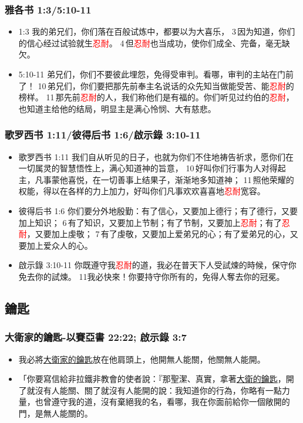 \subsubsection{雅各书 1:3/5:10-11} 
\begin{itemize}[noitemsep]
\item 1:3 我的弟兄们，你们落在百般试炼中，都要以为大喜乐， 3 因为知道，你们的信心经过试验就生\textcolor{red}{忍耐}。 4 但\textcolor{red}{忍耐}也当成功，使你们成全、完备，毫无缺欠。

\item 5:10-11 弟兄们，你们不要彼此埋怨，免得受审判。看哪，审判的主站在门前了！ 10 弟兄们，你们要把那先前奉主名说话的众先知当做能受苦、能\textcolor{red}{忍耐}的榜样。 11 那先前\textcolor{red}{忍耐}的人，我们称他们是有福的。你们听见过约伯的\textcolor{red}{忍耐}，也知道主给他的结局，明显主是满心怜悯、大有慈悲。
\end{itemize}




\subsubsection{歌罗西书 1:11/彼得后书 1:6/啟示錄 3:10-11} 
\begin{itemize}[noitemsep]
\item 歌罗西书 1:11 我们自从听见的日子，也就为你们不住地祷告祈求，愿你们在一切属灵的智慧悟性上，满心知道神的旨意， 10 好叫你们行事为人对得起主，凡事蒙他喜悦，在一切善事上结果子，渐渐地多知道神； 11 照他荣耀的权能，得以在各样的力上加力，好叫你们凡事欢欢喜喜地\textcolor{red}{忍耐}宽容。
 
\item 彼得后书 1:6 你们要分外地殷勤：有了信心，又要加上德行；有了德行，又要加上知识； 6 有了知识，又要加上节制；有了节制，又要加上\textcolor{red}{忍耐}；有了\textcolor{red}{忍耐}，又要加上虔敬； 7 有了虔敬，又要加上爱弟兄的心；有了爱弟兄的心，又要加上爱众人的心。

\item 啟示錄 3:10-11 你既遵守我\textcolor{red}{忍耐}的道，我必在普天下人受試煉的時候，保守你免去你的試煉。 11我必快來！你要持守你所有的，免得人奪去你的冠冕。
\end{itemize}




\subsection{鑰匙}

\subsubsection{大衛家的鑰匙-以賽亞書 22:22; 啟示錄 3:7}
\begin{itemize} 
\itemsep-.25em
\item 我必將\underline{大衛家的鑰匙}放在他肩頭上，他開無人能關，他關無人能開。
\item 「你要寫信給非拉鐵非教會的使者說：『那聖潔、真實，拿著\underline{大衛的鑰匙}，開了就沒有人能關、關了就沒有人能開的說：我知道你的行為，你略有一點力量，也曾遵守我的道，沒有棄絕我的名，看哪，我在你面前給你一個敞開的門，是無人能關的。
\end{itemize} 

